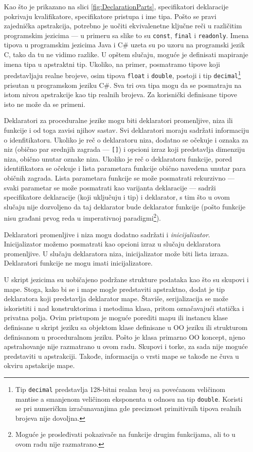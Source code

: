 Kao što je prikazano na slici \ref{fig:DeclarationParts}, specifikatori deklaracije pokrivaju kvalifikatore, specifikatore pristupa i ime tipa. Pošto se pravi zajednička apstrakcija, potrebno je uočiti ekvivalenetne ključne reči u različitim programskim jezicima --- u primeru sa slike to su \texttt{const}, \texttt{final} i \texttt{readonly}. Imena tipova u programskim jezicima Java i C\# uzeta su po uzoru na programski jezik C, tako da tu ne vidimo razlike. U opštem slučaju, moguće je definisati mapiranje imena tipa u apstraktni tip. Ukoliko, na primer, posmatramo tipove koji predstavljaju realne brojeve, osim tipova \texttt{float} i \texttt{double}, postoji i tip \texttt{decimal}\footnote{Tip \texttt{decimal} predstavlja 128-bitni realan broj sa povećanom veličinom mantise a smanjenom veličinom eksponenta u odnosu na tip \texttt{double}. Koristi se pri numeričkm izračunavanjima gde preciznost primitivnih tipova realnih brojeva nije dovoljna.} prisutan u programskom jeziku C\#. Sva tri ova tipa mogu da se posmatraju na istom nivou apstrakcije kao tip realnih brojeva. Za korisnički definisane tipove isto ne može da se primeni.

Deklaratori za proceduralne jezike mogu biti deklaratori promenljive, niza ili funkcije i od toga zavisi njihov sastav. Svi deklaratori moraju sadržati informaciju o idenfitikatoru. Ukoliko je reč o deklaratoru niza, dodatno se očekuje i oznaka za niz (obično par srednjih zagrada --- \texttt{[]}) i opcioni izraz koji predstavlja dimenziju niza, obično unutar oznake niza. Ukoliko je reč o deklaratoru funkcije, pored identifikatora se očekuje i lista parametara funkcije obično navedena unutar para običnih zagrada. Lista parametara funkcije se može posmatrati rekurzivno --- svaki parametar se može posmatrati kao varijanta deklaracije --- sadrži specifikatore deklaracije (koji uključuju i tip) i deklarator, s tim što u ovom slučaju nije dozvoljeno da taj deklarator bude deklarator funkcije (pošto funkcije nisu građani prvog reda u imperativnoj paradigmi\footnote{Moguće je prosleđivati pokazivače na funkcije drugim funkcijama, ali to u ovom radu nije razmatrano.}). 

Deklaratori promenljive i niza mogu dodatno sadržati i \emph{inicijalizator}. Inicijalizator možemo posmatrati kao opcioni izraz u slučaju deklaratora promenljive. U slučaju deklaratora niza, inicijalizator može biti lista izraza. Deklaratori funkcije ne mogu imati inicijalizatore.

U skript jezicima su uobičajeno podržane strukture podataka kao što su skupovi i mape. Stoga, kako bi se i mape mogle predstaviti apstraktno, dodat je tip deklaratora koji predstavlja deklarator mape. Štaviše, serijalizacija se može iskoristiti i nad konstruktorima i metodima klasa, pritom označavajući statička i privatna polja. Ovim pristupom je moguće porediti mapu ili instancu klase definisane u skript jeziku sa objektom klase definisane u OO jeziku ili strukturom definisanom u proceduralnom jeziku. Pošto je klasa primarno OO koncept, njeno apstrahovanje nije razmatrano u ovom radu. Skupovi i torke, za sada nije moguće predstaviti u apstrakciji. Takođe, informacija o vrsti mape se takođe ne čuva u okviru apstakcije mape.

